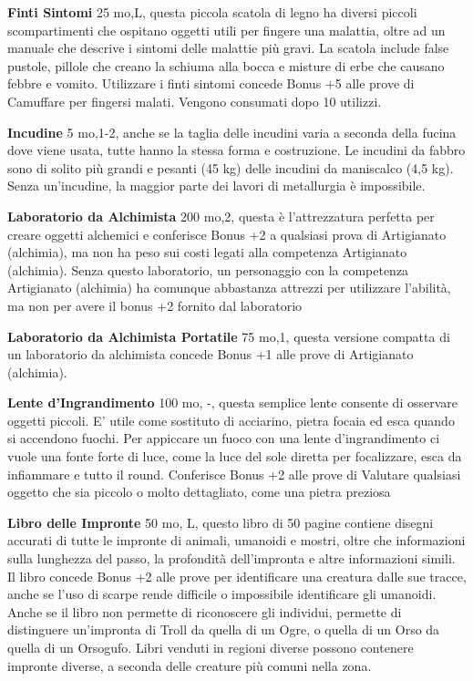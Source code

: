 \documentclass[a4paper,11pt,twoside,openany]{book}
\begin{document}
\textbf{Finti Sintomi} 25 mo,L, questa piccola scatola di legno ha diversi piccoli scompartimenti che ospitano oggetti utili per fingere una malattia, oltre ad un manuale che descrive i sintomi delle malattie più gravi. La scatola include false pustole, pillole che creano la schiuma alla bocca e misture di erbe che causano febbre e vomito.
Utilizzare i finti sintomi concede Bonus +5 alle prove di Camuffare per fingersi malati. Vengono consumati dopo 10 utilizzi.

\textbf{Incudine} 5 mo,1-2, anche se la taglia delle incudini varia a seconda della fucina dove viene usata, tutte hanno la stessa forma e costruzione. Le incudini da fabbro sono di solito più grandi e pesanti (45 kg) delle incudini da maniscalco (4,5 kg).
Senza un'incudine, la maggior parte dei lavori di metallurgia è impossibile.

\textbf{Laboratorio da Alchimista} 200 mo,2,  questa è l'attrezzatura perfetta per creare oggetti alchemici e conferisce Bonus +2 a qualsiasi prova di Artigianato (alchimia), ma non ha peso sui costi legati alla competenza Artigianato (alchimia).
Senza questo laboratorio, un personaggio con la competenza Artigianato (alchimia) ha comunque abbastanza attrezzi per utilizzare l'abilità, ma non per avere il bonus +2 fornito dal laboratorio

\textbf{Laboratorio da Alchimista Portatile} 75 mo,1, questa versione compatta di un laboratorio da alchimista concede Bonus +1 alle prove di Artigianato (alchimia).

\textbf{Lente d'Ingrandimento} 100 mo, -, questa semplice lente consente di osservare oggetti piccoli. E' utile come sostituto di acciarino, pietra focaia ed esca quando si accendono fuochi.
Per appiccare un fuoco con una lente d'ingrandimento ci vuole una fonte forte di luce, come la luce del sole diretta per focalizzare, esca da infiammare e tutto il round. Conferisce Bonus +2 alle prove di Valutare qualsiasi oggetto che sia piccolo o molto dettagliato, come una pietra preziosa

\textbf{Libro delle Impronte} 50 mo, L,  questo libro di 50 pagine contiene disegni accurati di tutte le impronte di animali, umanoidi e mostri, oltre che informazioni sulla lunghezza del passo, la profondità dell'impronta e altre informazioni simili. Il libro concede Bonus +2 alle prove per identificare una creatura dalle sue tracce, anche se l'uso di scarpe rende difficile o impossibile identificare gli umanoidi.
Anche se il libro non permette di riconoscere gli individui, permette di distinguere un'impronta di Troll da quella di un Ogre, o quella di un Orso da quella di un Orsogufo. Libri venduti in regioni diverse possono contenere impronte diverse, a seconda delle creature più comuni nella zona.
\end{document}

